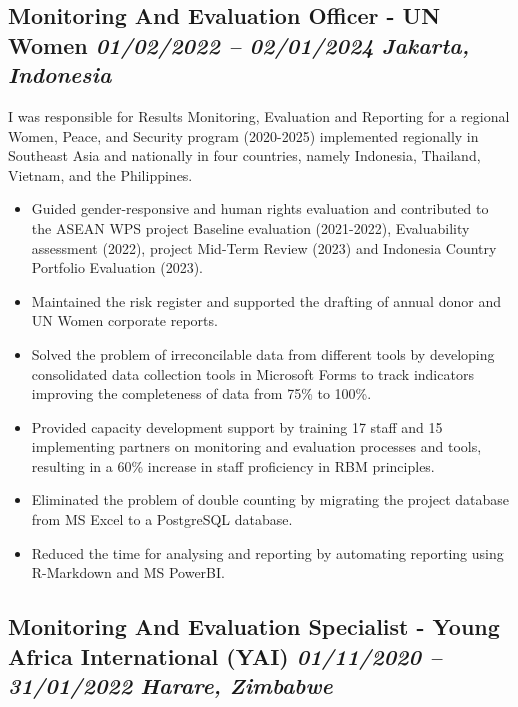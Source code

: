 \documentclass[
  10pt,
]{article}
\providecommand{\tightlist}{%
  \setlength{\itemsep}{0pt}\setlength{\parskip}{0pt}}
\begin{document}
\subsection{\texorpdfstring{Monitoring And Evaluation Officer - UN Women
\emph{01/02/2022 -- 02/01/2024} \textbar{} \emph{Jakarta, Indonesia}}{Monitoring And Evaluation Officer - UN Women 01/02/2022 -- 02/01/2024 \textbar{} Jakarta, Indonesia}}\label{monitoring-and-evaluation-officer---un-women-01022022-02012024-jakarta-indonesia}

I was responsible for Results Monitoring, Evaluation and Reporting for a regional Women, Peace, and Security program (2020-2025) implemented regionally in Southeast Asia and nationally in four countries, namely Indonesia, Thailand, Vietnam, and the Philippines.

\begin{itemize}
\tightlist
\item
Guided gender-responsive and human rights evaluation and contributed to the ASEAN WPS project Baseline evaluation (2021-2022), Evaluability assessment (2022), project Mid-Term Review (2023) and Indonesia Country Portfolio Evaluation (2023).
\item
Maintained the risk register and supported the drafting of annual donor and UN Women corporate reports.
\item
Solved the problem of irreconcilable data from different tools by developing consolidated data collection tools in Microsoft Forms to track indicators improving the completeness of data from 75\% to 100\%.
\item
Provided capacity development support by training 17 staff and 15 implementing partners on monitoring and evaluation processes and tools, resulting in a 60\% increase in staff proficiency in RBM principles.
\item
Eliminated the problem of double counting by migrating the project database from MS Excel to a PostgreSQL database.
\item
Reduced the time for analysing and reporting by automating reporting using R-Markdown and MS PowerBI.
\end{itemize}

\subsection{\texorpdfstring{Monitoring And Evaluation Specialist - Young
Africa International (YAI) \emph{01/11/2020 -- 31/01/2022} \textbar{}
\emph{Harare, Zimbabwe}}{Monitoring And Evaluation Specialist - Young Africa International (YAI) 01/11/2020 -- 31/01/2022 \textbar{} Harare, Zimbabwe}}\label{monitoring-and-evaluation-specialist---young-africa-international-yai-01112020-31012022-harare-zimbabwe}
\end{document}
